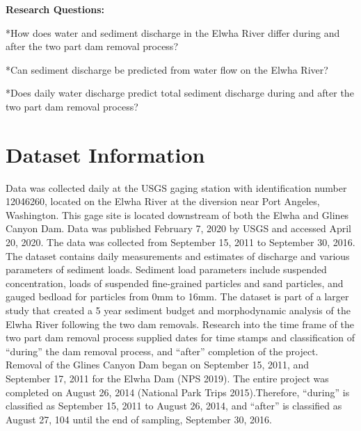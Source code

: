 \documentclass[12pt,]{article}
\begin{document}
\textbf{Research Questions:}

*How does water and sediment discharge in the Elwha River differ during
and after the two part dam removal process?

*Can sediment discharge be predicted from water flow on the Elwha River?

*Does daily water discharge predict total sediment discharge during and
after the two part dam removal process?

\newpage

\hypertarget{dataset-information}{%
\section{Dataset Information}\label{dataset-information}}

Data was collected daily at the USGS gaging station with identification
number 12046260, located on the Elwha River at the diversion near Port
Angeles, Washington. This gage site is located downstream of both the
Elwha and Glines Canyon Dam. Data was published February 7, 2020 by USGS
and accessed April 20, 2020. The data was collected from September 15,
2011 to September 30, 2016. The dataset contains daily measurements and
estimates of discharge and various parameters of sediment loads.
Sediment load parameters include suspended concentration, loads of
suspended fine-grained particles and sand particles, and gauged bedload
for particles from 0mm to 16mm. The dataset is part of a larger study
that created a 5 year sediment budget and morphodynamic analysis of the
Elwha River following the two dam removals. Research into the time frame
of the two part dam removal process supplied dates for time stamps and
classification of ``during'' the dam removal process, and ``after''
completion of the project. Removal of the Glines Canyon Dam began on
September 15, 2011, and September 17, 2011 for the Elwha Dam (NPS 2019).
The entire project was completed on August 26, 2014 (National Park Trips
2015).Therefore, ``during'' is classified as September 15, 2011 to
August 26, 2014, and ``after'' is classified as August 27, 104 until the
end of sampling, September 30, 2016.
\end{document}
